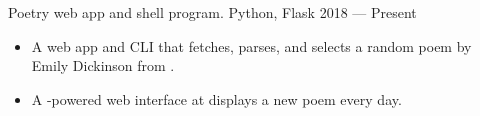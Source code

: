 \showoff
{}
{Poetry web app and shell program.}
{Python, Flask}
{2018 --- Present}

\begin{itemize}[label=$\triangleright$]
    \item A web app and CLI that fetches, parses, and selects a random poem by Emily Dickinson from .
    \item A -powered web interface at  displays a new poem every day.
\end{itemize}
